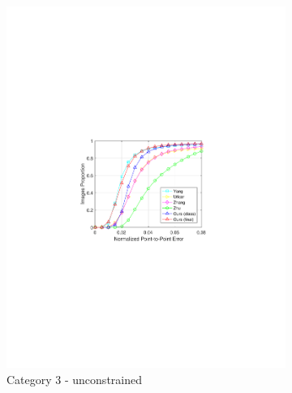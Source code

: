 \documentclass[letterpaper]{article} %
\begin{document}
\begin{figure}[t]
\begin{subfigure}[b]{0.3\textwidth}
            \includegraphics[width=\textwidth]{fig/C3Curve.pdf}
            \caption{{\small Category 3 - unconstrained}}
            \label{fig:test4}
        \end{subfigure}
        \qquad
        \begin{subfigure}[b]{0.3\textwidth}
            \centering

\end{subfigure}
\end{figure}
\end{document}
